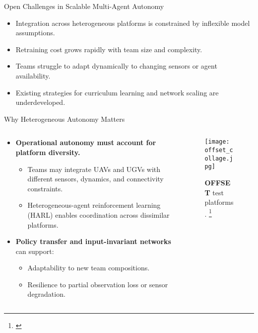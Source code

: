 \documentclass[xcolor={svgnames},aspectratio=169]{beamer}
\begin{document}
\begin{frame}{Open Challenges in Scalable Multi-Agent Autonomy}
    \begin{itemize}
        \item Integration across heterogeneous platforms is constrained by inflexible model assumptions.
        \item Retraining cost grows rapidly with team size and complexity.
        \item Teams struggle to adapt dynamically to changing sensors or agent availability.
        \item Existing strategies for curriculum learning and network scaling are underdeveloped.
    \end{itemize}
\end{frame}

\begin{frame}{Why Heterogeneous Autonomy Matters}
\begin{columns}
    \begin{column}{0.6\textwidth}
    \begin{itemize}
        \item \textbf{Operational autonomy must account for platform diversity.}
        \begin{itemize}
            \item Teams may integrate UAVs and UGVs with different sensors, dynamics, and connectivity constraints.
            \item Heterogeneous-agent reinforcement learning (HARL) enables coordination across dissimilar platforms.
        \end{itemize}
        \item \textbf{Policy transfer and input-invariant networks} can support:
        \begin{itemize}
            \item Adaptability to new team compositions.
            \item Resilience to partial observation loss or sensor degradation.
        \end{itemize}
    \end{itemize}
    \end{column}
    \begin{column}{0.4\textwidth}
        \begin{figure}[!h]
            \centering
            \texttt{[image: offset\_collage.jpg]}
            \caption{\textbf{OFFSET} test platforms.
                \footnote[frame]{\cite{zotero-2835}}}
            \label{fig:offset_collage}
        \end{figure}
    \end{column}
\end{columns}
\end{frame}
\end{document}
